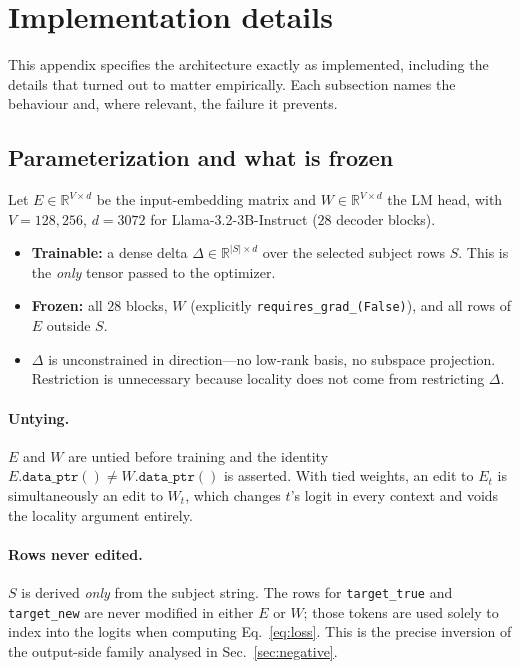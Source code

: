 \documentclass[11pt]{article}
\begin{document}
\section{Implementation details}

This appendix specifies the architecture exactly as implemented, including the
details that turned out to matter empirically. Each subsection names the
behaviour and, where relevant, the failure it prevents.

\subsection{Parameterization and what is frozen}

Let $E \in \mathbb{R}^{V \times d}$ be the input-embedding matrix and
$W \in \mathbb{R}^{V \times d}$ the LM head, with $V = 128{,}256$, $d = 3072$
for Llama-3.2-3B-Instruct ($28$ decoder blocks).

\begin{itemize}
\item \textbf{Trainable:} a dense delta $\Delta \in \mathbb{R}^{|S| \times d}$
      over the selected subject rows $S$. This is the \emph{only} tensor passed
      to the optimizer.
\item \textbf{Frozen:} all $28$ blocks, $W$ (explicitly
      \texttt{requires\_grad\_(False)}), and all rows of $E$ outside $S$.
\item $\Delta$ is unconstrained in direction---no low-rank basis, no subspace
      projection. Restriction is unnecessary because locality does not come
      from restricting $\Delta$.
\end{itemize}

\paragraph{Untying.} $E$ and $W$ are untied before training and the identity
$E.\texttt{data\_ptr}() \neq W.\texttt{data\_ptr}()$ is asserted. With tied
weights, an edit to $E_t$ is simultaneously an edit to $W_t$, which changes
$t$'s logit in every context and voids the locality argument entirely.

\paragraph{Rows never edited.} $S$ is derived \emph{only} from the subject
string. The rows for \texttt{target\_true} and \texttt{target\_new} are never
modified in either $E$ or $W$; those tokens are used solely to index into the
logits when computing Eq.~\eqref{eq:loss}. This is the precise inversion of the
output-side family analysed in Sec.~\ref{sec:negative}.
\end{document}
